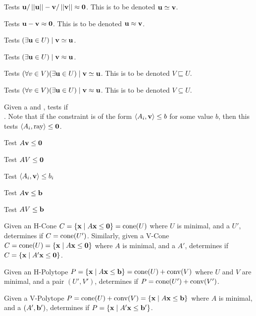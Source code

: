 Tests $\u/\norm{\u} - \v/\norm{\v} \approx \0 $.  This is to be denoted $\u \simeq \v$.
\lstisequivalent

Tests $\u - \v \approx \0$.  This is to be denoted $\u \approx \v$.
\lstisequal

Tests $(\exists \u \in U) \st \v \simeq \u$.
\lsthasequivalentmember

Tests $(\exists \u \in U) \st \v \approx \u$.
\lsthasequalmember

Tests $(\forall v \in V)(\exists \u \in U) \st \v \simeq \u$.  This is to be denoted $V \sqsubseteq U$.
\lstsubsetmodeq

Tests $(\forall v \in V)(\exists \u \in U) \st \v \approx \u$.  This is to be denoted $V \subseteq U$.
\lstsubset

Given a  and , tests if \\
.  Note that if the constraint is of the form $\ip{A_i}{\v} \leq b$ for some value $b$, then this tests $\ip{A_i}{\mli{ray}}\leq\0$.
\lstraysatisfieda

Test $A\v \leq \0$
\lstraysatisfiedb

Test $AV \leq \0$
\lstrayssatisfied

Test $\ip{A_i}{\v} \leq b_i$
\lstvecsatisfieda

Test $A\v \leq \b$
\lstvecsatisfiedb

Test $AV \leq \b$
\lstvecssatisfied

Given an H-Cone $C = \HC{A} = \cone(U)$ where $U$ is minimal, and a  $U'$, determines if $C = \cone(U')$.
Similarly, given a V-Cone $C = \cone(U) = \HC{A}$ where $A$ is minimal, and a  $A'$, determines if $C = \HC{A'}$.
\lstequivalentconerep

Given an H-Polytope $P = \HP{A}{\b} = \VP{U}{V}$ where $U$ and $V$ are minimal, and a pair $(U',V')$, determines if $P = \VP{U'}{V'}$.
\lstequivalenthpolyrep

Given a V-Polytope $P = \VP{U}{V} = \HP{A}{\b}$ where $A$ is minimal, and a  $(A',\b')$, determines if $P = \HP{A'}{\b'}$.
\lstequivalentvpolyrep



